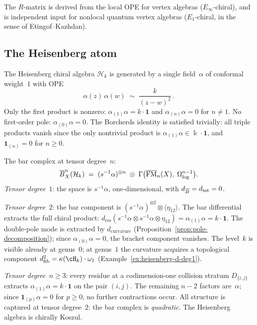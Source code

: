 The $R$-matrix is derived from the local OPE for vertex algebras
($E_\infty$-chiral), and is independent input for nonlocal quantum
vertex algebras ($E_1$-chiral, in the sense of Etingof--Kazhdan).

\subsection*{The Heisenberg atom}

The Heisenberg chiral algebra $\mathcal H_k$ is generated by a
single field~$\alpha$ of conformal weight~$1$ with OPE
\[
\alpha(z)\,\alpha(w)
\;\sim\;
\frac{k}{(z-w)^2}\,.
\]
Only the first product is nonzero: $\alpha_{(1)}\alpha=k\cdot\mathbf 1$
and $\alpha_{(n)}\alpha=0$ for $n\neq 1$. No first-order pole:
$\alpha_{(0)}\alpha=0$. The Borcherds identity is satisfied
trivially: all triple products vanish since the only nontrivial
product is $\alpha_{(1)}\alpha\in\Bbbk\cdot\mathbf 1$, and
$\mathbf 1_{(n)}=0$ for $n\ge 0$.

The bar complex at tensor degree~$n$:
\[
\overline{B}^n_X(\mathcal H_k)
\;=\;
(s^{-1}\alpha)^{\otimes n}
\;\otimes\;
\Gamma\bigl(\overline{\mathrm{FM}}_n(X),\;
\Omega^{n-1}_{\log}\bigr).
\]
\emph{Tensor degree~$1$}: the space is $s^{-1}\alpha$, one-dimensional,
with $d_{\overline{B}}=d_{\mathrm{int}}=0$.

\emph{Tensor degree~$2$}: the bar component is
$(s^{-1}\alpha)^{\otimes 2}\otimes\langle\eta_{12}\rangle$.
The bar differential extracts the full chiral product:
$d_{\mathrm{res}}(s^{-1}\alpha\otimes s^{-1}\alpha
\otimes\eta_{12}) = \alpha_{(1)}\alpha = k\cdot\mathbf{1}$.
The double-pole mode is extracted by
$d_{\mathrm{curvature}}$
(Proposition~\ref{prop:pole-decomposition}); since
$\alpha_{(0)}\alpha = 0$, the bracket component vanishes.
The level~$k$ is visible already at genus~$0$; at genus~$1$
the curvature acquires a topological component
$d_{\mathrm{fib}}^2 = \kappa(\cH_k)\cdot\omega_1$
(Example~\ref{ex:heisenberg-d-deg1}).

\emph{Tensor degree~$n\ge 3$}: every residue at a codimension-one
collision stratum $D_{\{i,j\}}$ extracts $\alpha_{(1)}\alpha
=k\cdot\mathbf 1$ on the pair $(i,j)$. The remaining $n-2$
factors are~$\alpha$; since $\mathbf 1_{(p)}\alpha=0$ for
$p\ge 0$, no further contractions occur. All structure is
captured at tensor degree~$2$: the bar complex is
\emph{quadratic}. The Heisenberg algebra is chirally Koszul.

